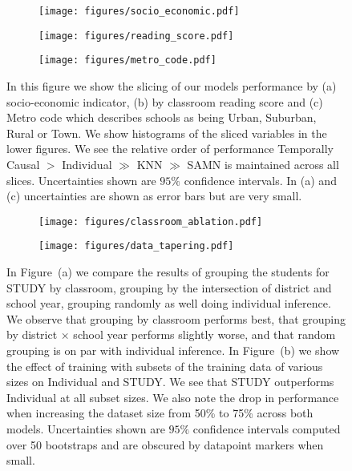 \documentclass{article}
\begin{document}
\begin{figure}[]
    
    \begin{subfigure}{0.4\linewidth}
        \texttt{[image: figures/socio\_economic.pdf]}
        \caption{}
    \end{subfigure}
    \begin{subfigure}{0.4\linewidth}
        \texttt{[image: figures/reading\_score.pdf]}
        \caption{}
    \end{subfigure}
    \begin{subfigure}{0.4\linewidth}
        \texttt{[image: figures/metro\_code.pdf]}
        \caption{}
    \end{subfigure}
    \caption{In this figure we show the slicing of our models performance by (a) socio-economic indicator, (b) by classroom reading score and (c) Metro code which describes schools as being Urban, Suburban, Rural or Town. We show histograms of the sliced variables in the lower figures. We see the relative order of performance Temporally Causal $>$ Individual $\gg$ KNN $\gg$ SAMN is maintained across all slices. Uncertainties shown are $95\%$ confidence intervals. In (a) and (c) uncertainties are shown as error bars but are very small.}
    \label{fig:slices}
\end{figure}


\begin{figure}[]
  
    \begin{subfigure}[t]{0.4\linewidth}
        \texttt{[image: figures/classroom\_ablation.pdf]}
        \caption{}
        \label{fig:classroom_ablation}
    \end{subfigure}
    \begin{subfigure}[t]{0.4\linewidth}
        \texttt{[image: figures/data\_tapering.pdf]}
        \caption{}
        \label{fig:data_ablation}
    \end{subfigure}
        \caption{In Figure~(a) we compare the results of grouping the students for STUDY by classroom, grouping by the intersection of district and school year, grouping randomly as well doing individual inference. We observe that grouping by classroom performs best, that grouping by district $\times$ school year performs slightly worse, and that random grouping is on par with individual inference.
        In Figure~(b) we show the effect of training with subsets of the training data of various sizes on Individual and STUDY. We see that STUDY outperforms Individual at all subset sizes. We also note the drop in performance when increasing the dataset size from 50\% to 75\% across both models. Uncertainties shown are $95\%$ confidence intervals computed over 50 bootstraps and are obscured by datapoint markers when small.  }
\end{figure}
\end{document}
